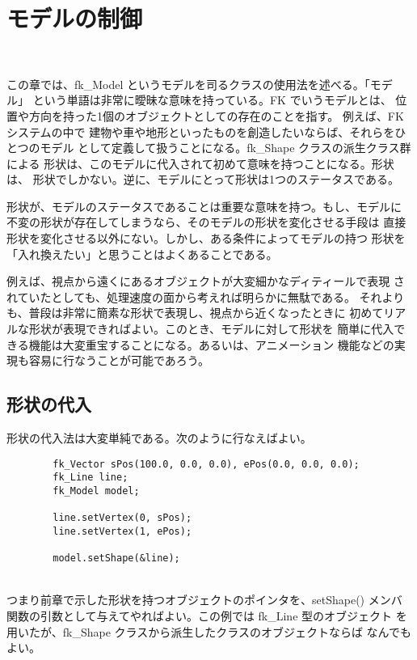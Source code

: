 \chapter{モデルの制御} \label{chap:model} ~

この章では、fk\_Model というモデルを司るクラスの使用法を述べる。「モデル」
という単語は非常に曖昧な意味を持っている。FK でいうモデルとは、
位置や方向を持った1個のオブジェクトとしての存在のことを指す。
例えば、FK システムの中で
建物や車や地形といったものを創造したいならば、それらをひとつのモデル
として定義して扱うことになる。fk\_Shape クラスの派生クラス群による
形状は、このモデルに代入されて初めて意味を持つことになる。形状は、
形状でしかない。逆に、モデルにとって形状は1つのステータスである。

形状が、モデルのステータスであることは重要な意味を持つ。もし、モデルに
不変の形状が存在してしまうなら、そのモデルの形状を変化させる手段は
直接形状を変化させる以外にない。しかし、ある条件によってモデルの持つ
形状を「入れ換えたい」と思うことはよくあることである。

例えば、視点から遠くにあるオブジェクトが大変細かなディティールで表現
されていたとしても、処理速度の面から考えれば明らかに無駄である。
それよりも、普段は非常に簡素な形状で表現し、視点から近くなったときに
初めてリアルな形状が表現できればよい。このとき、モデルに対して形状を
簡単に代入できる機能は大変重宝することになる。あるいは、アニメーション
機能などの実現も容易に行なうことが可能であろう。
\section{形状の代入}
形状の代入法は大変単純である。次のように行なえばよい。
\\
\begin{breakbox}
\begin{verbatim}
        fk_Vector sPos(100.0, 0.0, 0.0), ePos(0.0, 0.0, 0.0);
        fk_Line line;
        fk_Model model;

        line.setVertex(0, sPos);
        line.setVertex(1, ePos);

        model.setShape(&line);
\end{verbatim}
\end{breakbox}
~ \\
つまり前章で示した形状を持つオブジェクトのポインタを、setShape() メンバ
関数の引数として与えてやればよい。この例では fk\_Line 型のオブジェクト
を用いたが、fk\_Shape クラスから派生したクラスのオブジェクトならば
なんでもよい。


